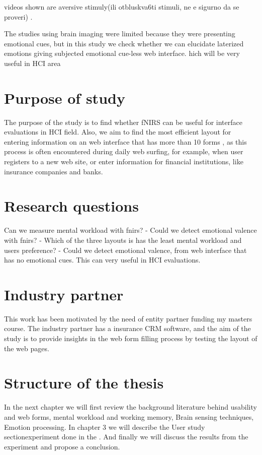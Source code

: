 \documentclass[a4paper]{report}
\begin{document}
	videos shown are aversive stimuly(ili otbluskva6ti stimuli, ne e sigurno da se proveri) . 
	
	The studies using brain imaging were limited because they were presenting emotional cues, but in this study we check whether we can elucidate laterized emotions giving subjected emotional cue-less web interface. hich will be very useful in HCI area
	\section{Purpose of study}
		The purpose of the study is to find whether fNIRS can be useful for interface evaluations in HCI field. Also, we aim to find the most efficient layout for entering information on an web interface that has more than 10 forms , as this process is often encountered during daily web surfing, for example, when user registers to a new web site, or enter information for financial institutions, like insurance companies and banks.
	\section{Research questions}
		Can we measure mental workload with fnirs?
		- Could we detect emotional valence with fnirs?
		- Which of the three layouts is has the least mental workload and users preference?
		- Could we detect emotional valence, from web interface that has no emotional cues. This can very useful in HCI evaluations.
	\section{Industry partner}
		This work has been motivated by the need of entity partner funding my masters course. The industry partner has a insurance CRM software, and the aim of the study is to provide insights in the web form filling process by testing the layout of the web pages.
		
	\section{Structure of the thesis}
		In the next chapter we will first review the background literature behind usability and web forms, mental workload and working memory, Brain sensing techniques, Emotion processing. In chapter 3 we will describe the User study sectionexperiment done in the . And finally we will discuss the results from the experiment and propose a conclusion.
\end{document}
